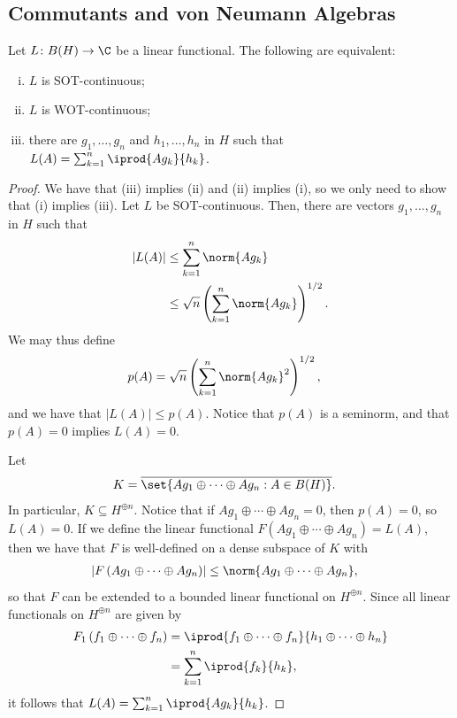 \documentclass[10pt]{mypackage}
\begin{document}
\subsection{Commutants and von Neumann Algebras}%
\begin{proposition}
  Let $L\colon B(H)\to \C$ be a linear functional. The following are equivalent:
  \begin{enumerate}[(i)]
    \item $L$ is SOT-continuous;
    \item $L$ is WOT-continuous;
    \item there are $g_1,\dots,g_n$ and $h_1,\dots,h_n$ in $H$ such that $L(A) = \sum_{k=1}^{n} \iprod{Ag_k}{h_k}$.
  \end{enumerate}
\end{proposition}
\begin{proof}
  We have that (iii) implies (ii) and (ii) implies (i), so we only need to show that (i) implies (iii). Let $L$ be SOT-continuous. Then, there are vectors $g_1,\dots,g_n$ in $H$ such that
  \begin{align*}
    \left\vert L(A) \right\vert &\leq \sum_{k=1}^{n} \norm{Ag_k}\\
                                &\leq \sqrt{n} \left( \sum_{k=1}^{n}\norm{Ag_k} \right)^{1/2}.
  \end{align*}
  We may thus define
  \begin{align*}
    p(A) &= \sqrt{n} \left( \sum_{k=1}^{n} \norm{Ag_k}^2 \right)^{1/2},
  \end{align*}
  and we have that $\left\vert L(A) \right\vert\leq p(A)$. Notice that $p(A)$ is a seminorm, and that $p(A) = 0$ implies $L(A) = 0$.

  Let
  \begin{align*}
    K &= \overline{\set{Ag_1\oplus\cdots\oplus Ag_n : A\in B(H)}}.
  \end{align*}
  In particular, $K\subseteq H^{\oplus n}$. Notice that if $Ag_1\oplus\cdots\oplus Ag_n = 0$, then $p(A) = 0$, so $L(A) = 0$. If we define the linear functional $F\left( Ag_1\oplus\cdots\oplus Ag_n \right) = L(A)$, then we have that $F$ is well-defined on a dense subspace of $K$ with
  \begin{align*}
    \left\vert F\left( Ag_1\oplus\cdots\oplus Ag_n \right) \right\vert &\leq \norm{Ag_1\oplus\cdots\oplus Ag_n},
  \end{align*}
  so that $F$ can be extended to a bounded linear functional on $H^{\oplus n}$. Since all linear functionals on $H^{\oplus n}$ are given by
  \begin{align*}
    F_1\left( f_1\oplus\cdots\oplus f_n \right) &= \iprod{f_1\oplus\cdots\oplus f_n}{h_1\oplus\cdots\oplus h_n}\\
                                                &= \sum_{k=1}^{n} \iprod{f_k}{h_k},
  \end{align*}
  it follows that $L(A) = \sum_{k=1}^{n} \iprod{Ag_k}{h_k}$.
\end{proof}
\end{document}
